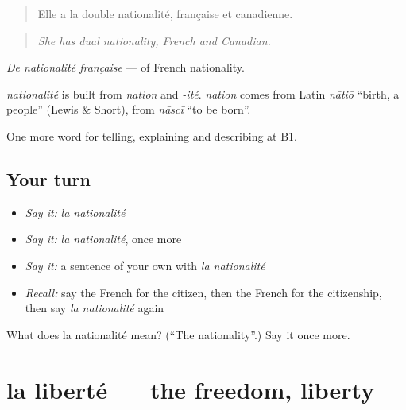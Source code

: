 \begin{quote}
Elle a la double nationalité, française et canadienne.
\end{quote}

\begin{quote}
\emph{She has dual nationality, French and Canadian.}
\end{quote}

\emph{De nationalité française} — of French nationality.

\begin{cousinweb}
\emph{nationalité} is built from \emph{nation} and \emph{-ité}. \emph{nation} comes from Latin \emph{nātiō} \textquotedblleft{}birth, a people\textquotedblright{} (Lewis \& Short), from \emph{nāscī} \textquotedblleft{}to be born\textquotedblright{}.
\end{cousinweb}

\begin{grammarlens}[title={What you've built}]
One more word for telling, explaining and describing at B1.
\end{grammarlens}

\subsection*{Your turn}
\begin{itemize}
\raggedright
  \item \emph{Say it:} \emph{la nationalité}
  \item \emph{Say it:} \emph{la nationalité}, once more
  \item \emph{Say it:} a sentence of your own with \emph{la nationalité}
  \item \emph{Recall:} say the French for the citizen, then the French for the citizenship, then say \emph{la nationalité} again
\end{itemize}

\begin{tcolorbox}[breakable,colback=teal!4,colframe=teal!35!black,title={Before you move on}]
What does la nationalité mean? (\textquotedblleft{}The nationality\textquotedblright{}.) Say it once more.
\end{tcolorbox}
\section[la liberté]{la liberté — the freedom, liberty}

\label{lesson:FR-C362-liberte}



